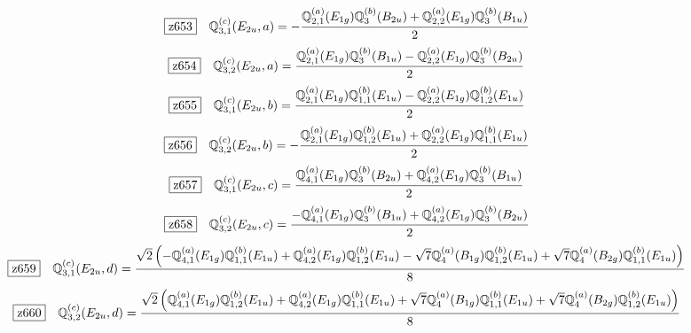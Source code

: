 \documentclass[fleqn,10pt,landscape]{jsarticle}
\begin{document}
\begin{dmath*}
\hspace*{3mm}\fbox{z653}\quad \mathbb{Q}_{3,1}^{(c)}(E_{2u},a)=- \frac{\mathbb{Q}_{2,1}^{(a)}(E_{1g}) \mathbb{Q}_{3}^{(b)}(B_{2u}) + \mathbb{Q}_{2,2}^{(a)}(E_{1g}) \mathbb{Q}_{3}^{(b)}(B_{1u})}{2}
\end{dmath*}
\begin{dmath*}
\hspace*{3mm}\fbox{z654}\quad \mathbb{Q}_{3,2}^{(c)}(E_{2u},a)=\frac{\mathbb{Q}_{2,1}^{(a)}(E_{1g}) \mathbb{Q}_{3}^{(b)}(B_{1u}) - \mathbb{Q}_{2,2}^{(a)}(E_{1g}) \mathbb{Q}_{3}^{(b)}(B_{2u})}{2}
\end{dmath*}
\begin{dmath*}
\hspace*{3mm}\fbox{z655}\quad \mathbb{Q}_{3,1}^{(c)}(E_{2u},b)=\frac{\mathbb{Q}_{2,1}^{(a)}(E_{1g}) \mathbb{Q}_{1,1}^{(b)}(E_{1u}) - \mathbb{Q}_{2,2}^{(a)}(E_{1g}) \mathbb{Q}_{1,2}^{(b)}(E_{1u})}{2}
\end{dmath*}
\begin{dmath*}
\hspace*{3mm}\fbox{z656}\quad \mathbb{Q}_{3,2}^{(c)}(E_{2u},b)=- \frac{\mathbb{Q}_{2,1}^{(a)}(E_{1g}) \mathbb{Q}_{1,2}^{(b)}(E_{1u}) + \mathbb{Q}_{2,2}^{(a)}(E_{1g}) \mathbb{Q}_{1,1}^{(b)}(E_{1u})}{2}
\end{dmath*}
\begin{dmath*}
\hspace*{3mm}\fbox{z657}\quad \mathbb{Q}_{3,1}^{(c)}(E_{2u},c)=\frac{\mathbb{Q}_{4,1}^{(a)}(E_{1g}) \mathbb{Q}_{3}^{(b)}(B_{2u}) + \mathbb{Q}_{4,2}^{(a)}(E_{1g}) \mathbb{Q}_{3}^{(b)}(B_{1u})}{2}
\end{dmath*}
\begin{dmath*}
\hspace*{3mm}\fbox{z658}\quad \mathbb{Q}_{3,2}^{(c)}(E_{2u},c)=\frac{- \mathbb{Q}_{4,1}^{(a)}(E_{1g}) \mathbb{Q}_{3}^{(b)}(B_{1u}) + \mathbb{Q}_{4,2}^{(a)}(E_{1g}) \mathbb{Q}_{3}^{(b)}(B_{2u})}{2}
\end{dmath*}
\begin{dmath*}
\hspace*{3mm}\fbox{z659}\quad \mathbb{Q}_{3,1}^{(c)}(E_{2u},d)=\frac{\sqrt{2} \left(- \mathbb{Q}_{4,1}^{(a)}(E_{1g}) \mathbb{Q}_{1,1}^{(b)}(E_{1u}) + \mathbb{Q}_{4,2}^{(a)}(E_{1g}) \mathbb{Q}_{1,2}^{(b)}(E_{1u}) - \sqrt{7} \mathbb{Q}_{4}^{(a)}(B_{1g}) \mathbb{Q}_{1,2}^{(b)}(E_{1u}) + \sqrt{7} \mathbb{Q}_{4}^{(a)}(B_{2g}) \mathbb{Q}_{1,1}^{(b)}(E_{1u})\right)}{8}
\end{dmath*}
\begin{dmath*}
\hspace*{3mm}\fbox{z660}\quad \mathbb{Q}_{3,2}^{(c)}(E_{2u},d)=\frac{\sqrt{2} \left(\mathbb{Q}_{4,1}^{(a)}(E_{1g}) \mathbb{Q}_{1,2}^{(b)}(E_{1u}) + \mathbb{Q}_{4,2}^{(a)}(E_{1g}) \mathbb{Q}_{1,1}^{(b)}(E_{1u}) + \sqrt{7} \mathbb{Q}_{4}^{(a)}(B_{1g}) \mathbb{Q}_{1,1}^{(b)}(E_{1u}) + \sqrt{7} \mathbb{Q}_{4}^{(a)}(B_{2g}) \mathbb{Q}_{1,2}^{(b)}(E_{1u})\right)}{8}
\end{dmath*}
\end{document}

